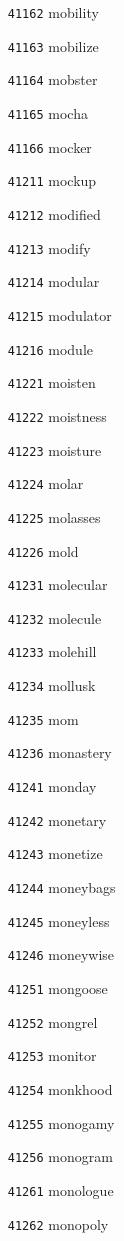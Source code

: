 \documentclass[twoside,11pt]{article}
\begin{document}
\begin{multicols}{5}
\begin{enumerate}
\item[\texttt{41162}] mobility
\item[\texttt{41163}] mobilize
\item[\texttt{41164}] mobster
\item[\texttt{41165}] mocha
\item[\texttt{41166}] mocker
\item[\texttt{41211}] mockup
\item[\texttt{41212}] modified
\item[\texttt{41213}] modify
\item[\texttt{41214}] modular
\item[\texttt{41215}] modulator
\item[\texttt{41216}] module
\item[\texttt{41221}] moisten
\item[\texttt{41222}] moistness
\item[\texttt{41223}] moisture
\item[\texttt{41224}] molar
\item[\texttt{41225}] molasses
\item[\texttt{41226}] mold
\item[\texttt{41231}] molecular
\item[\texttt{41232}] molecule
\item[\texttt{41233}] molehill
\item[\texttt{41234}] mollusk
\item[\texttt{41235}] mom
\item[\texttt{41236}] monastery
\item[\texttt{41241}] monday
\item[\texttt{41242}] monetary
\item[\texttt{41243}] monetize
\item[\texttt{41244}] moneybags
\item[\texttt{41245}] moneyless
\item[\texttt{41246}] moneywise
\item[\texttt{41251}] mongoose
\item[\texttt{41252}] mongrel
\item[\texttt{41253}] monitor
\item[\texttt{41254}] monkhood
\item[\texttt{41255}] monogamy
\item[\texttt{41256}] monogram
\item[\texttt{41261}] monologue
\item[\texttt{41262}] monopoly

\end{enumerate}
\end{multicols}
\end{document}
